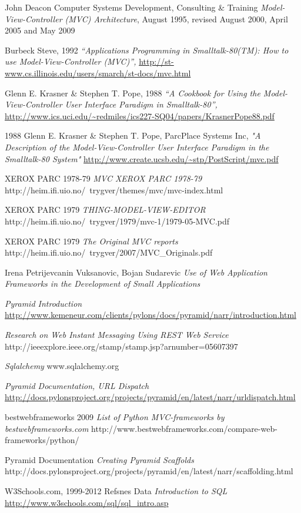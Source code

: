 \documentclass[finnish,utf8,nonumbib,palatino,kandi]{gradu2}
\begin{document}
\begin{thebibliography}{13} %
    John Deacon Computer Systems Development, Consulting \& Training
    \emph{Model-View-Controller (MVC) Architecture},
    August 1995, revised August 2000, April 2005 and May 2009

   Burbeck Steve, 1992
  \emph{“Applications Programming in Smalltalk-80(TM): How to use Model-View-Controller (MVC)”,}
  \url{http://st-www.cs.illinois.edu/users/smarch/st-docs/mvc.html}

   Glenn E. Krasner \& Stephen T. Pope, 1988
  \emph{“A Cookbook for Using the Model-View-Controller User Interface Paradigm in Smalltalk-80”,}
  \url{http://www.ics.uci.edu/~redmiles/ics227-SQ04/papers/KrasnerPope88.pdf}

 1988 Glenn E. Krasner \& Stephen T. Pope, ParcPlace Systems Inc,
	\emph{"A Description of the Model-View-Controller User Interface Paradigm in the Smalltalk-80 System"}
	\url{http://www.create.ucsb.edu/~stp/PostScript/mvc.pdf}

  XEROX PARC 1978-79
  \emph{MVC XEROX PARC 1978-79}
http://heim.ifi.uio.no/~trygver/themes/mvc/mvc-index.html

  XEROX PARC 1979
  \emph{THING-MODEL-VIEW-EDITOR}
   http://heim.ifi.uio.no/~trygver/1979/mvc-1/1979-05-MVC.pdf

  XEROX PARC 1979
  \emph{The Original MVC reports}
 http://heim.ifi.uio.no/~trygver/2007/MVC\_Originals.pdf

Irena Petrijevcanin Vuksanovic, Bojan Sudarevic
  \emph{Use of Web Application Frameworks in the Development of Small Applications}


  \emph{Pyramid Introduction}
   \url{http://www.kemeneur.com/clients/pylons/docs/pyramid/narr/introduction.html}

\emph{Research on Web Instant Messaging Using REST Web Service}
http://ieeexplore.ieee.org/stamp/stamp.jsp?arnumber=05607397

\emph{Sqlalchemy}
www.sqlalchemy.org

\emph{Pyramid Documentation, URL Dispatch}
\url{http://docs.pylonsproject.org/projects/pyramid/en/latest/narr/urldispatch.html}

bestwebframeworks 2009
\emph{List of Python MVC-frameworks by bestwebframeworks.com}
http://www.bestwebframeworks.com/compare-web-frameworks/python/

Pyramid Documentation
\emph{Creating Pyramid Scaffolds}
http://docs.pylonsproject.org/projects/pyramid/en/latest/narr/scaffolding.html

W3Schools.com, 1999-2012 Refsnes Data
\emph{Introduction to SQL}
\url{http://www.w3schools.com/sql/sql_intro.asp}

\end{thebibliography}
\end{document}
